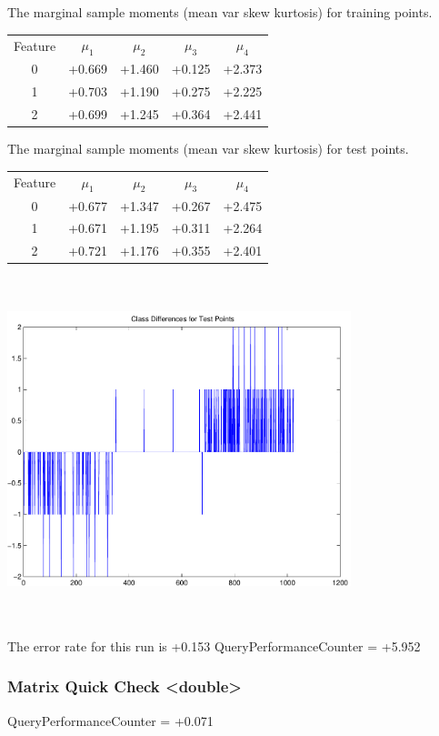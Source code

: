\documentclass[9pt]{article}
\theoremstyle{plain}
\theoremstyle{definition}
\theoremstyle{remark}
\numberwithin{equation}{section}
\begin{document}
The marginal sample moments (mean var skew kurtosis) for training points.\newline
\begin{tabular}{ c |  c  c  c  c}
Feature & $\mu_1$ & $\mu_2$ & $\mu_3$ & $\mu_4$ \\
0 & +0.669 & +1.460 & +0.125& +2.373 \\
\hline
1 & +0.703 & +1.190 & +0.275& +2.225 \\
\hline
2 & +0.699 & +1.245 & +0.364& +2.441 \\
\hline
\end{tabular}
\newline
The marginal sample moments (mean var skew kurtosis) for test points.\newline
\begin{tabular}{ c | c  c  c  c}
Feature & $\mu_1$ & $\mu_2$ & $\mu_3$ & $\mu_4$ \\
0 & +0.677 & +1.347 & +0.267& +2.475\\
\hline
1 & +0.671 & +1.195 & +0.311& +2.264\\
\hline
2 & +0.721 & +1.176 & +0.355& +2.401\\
\hline
\end{tabular}\newline
\includegraphics[width=10.0cm,height=10.0cm]{classDiffs.pdf}

The error rate for this run is +0.153\newline
QueryPerformanceCounter  =  +5.952
\subsubsection{Matrix Quick Check <double>}
QueryPerformanceCounter  =  +0.071
\end{document}
